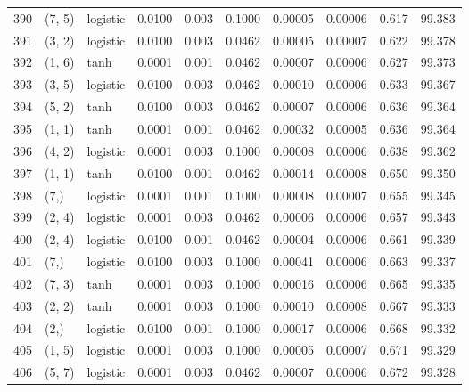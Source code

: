 \begin{tabular}{lllrrrrrrr}
390 &      (7, 5) &  logistic &  0.0100 &  0.003 &  0.1000 &          0.00005 &    0.00006 &       0.617 &    99.383 \\
391 &      (3, 2) &  logistic &  0.0100 &  0.003 &  0.0462 &          0.00005 &    0.00007 &       0.622 &    99.378 \\
392 &      (1, 6) &      tanh &  0.0001 &  0.001 &  0.0462 &          0.00007 &    0.00006 &       0.627 &    99.373 \\
393 &      (3, 5) &  logistic &  0.0100 &  0.003 &  0.0462 &          0.00010 &    0.00006 &       0.633 &    99.367 \\
394 &      (5, 2) &      tanh &  0.0100 &  0.003 &  0.0462 &          0.00007 &    0.00006 &       0.636 &    99.364 \\
395 &      (1, 1) &      tanh &  0.0001 &  0.001 &  0.0462 &          0.00032 &    0.00005 &       0.636 &    99.364 \\
396 &      (4, 2) &  logistic &  0.0001 &  0.003 &  0.1000 &          0.00008 &    0.00006 &       0.638 &    99.362 \\
397 &      (1, 1) &      tanh &  0.0100 &  0.001 &  0.0462 &          0.00014 &    0.00008 &       0.650 &    99.350 \\
398 &        (7,) &  logistic &  0.0001 &  0.001 &  0.1000 &          0.00008 &    0.00007 &       0.655 &    99.345 \\
399 &      (2, 4) &  logistic &  0.0001 &  0.003 &  0.0462 &          0.00006 &    0.00006 &       0.657 &    99.343 \\
400 &      (2, 4) &  logistic &  0.0100 &  0.001 &  0.0462 &          0.00004 &    0.00006 &       0.661 &    99.339 \\
401 &        (7,) &  logistic &  0.0100 &  0.003 &  0.1000 &          0.00041 &    0.00006 &       0.663 &    99.337 \\
402 &      (7, 3) &      tanh &  0.0001 &  0.003 &  0.1000 &          0.00016 &    0.00006 &       0.665 &    99.335 \\
403 &      (2, 2) &      tanh &  0.0001 &  0.003 &  0.1000 &          0.00010 &    0.00008 &       0.667 &    99.333 \\
404 &        (2,) &  logistic &  0.0100 &  0.001 &  0.1000 &          0.00017 &    0.00006 &       0.668 &    99.332 \\
405 &      (1, 5) &  logistic &  0.0001 &  0.003 &  0.1000 &          0.00005 &    0.00007 &       0.671 &    99.329 \\
406 &      (5, 7) &  logistic &  0.0001 &  0.003 &  0.0462 &          0.00007 &    0.00006 &       0.672 &    99.328 \\

\end{tabular}
